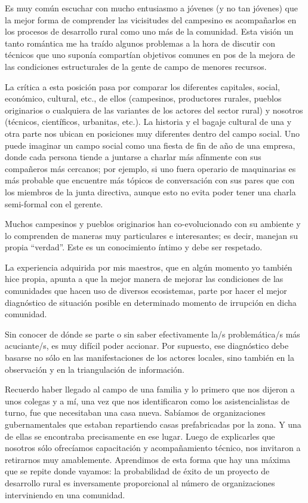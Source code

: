 \documentclass[
]{article}
\begin{document}
Es muy común escuchar con mucho entusiasmo a jóvenes (y no tan jóvenes)
que la mejor forma de comprender las vicisitudes del campesino es
acompañarlos en los procesos de desarrollo rural como uno más de la
comunidad. Esta visión un tanto romántica me ha traído algunos problemas
a la hora de discutir con técnicos que uno suponía compartían objetivos
comunes en pos de la mejora de las condiciones estructurales de la gente
de campo de menores recursos.

La crítica a esta posición pasa por comparar los diferentes capitales,
social, económico, cultural, etc., de ellos (campesinos, productores
rurales, pueblos originarios o cualquiera de las variantes de los
actores del sector rural) y nosotros (técnicos, científicos, urbanitas,
etc.). La historia y el bagaje cultural de una y otra parte nos ubican
en posiciones muy diferentes dentro del campo social. Uno puede imaginar
un campo social como una fiesta de fin de año de una empresa, donde cada
persona tiende a juntarse a charlar más afínmente con sus compañeros más
cercanos; por ejemplo, si uno fuera operario de maquinarias es más
probable que encuentre más tópicos de conversación con sus pares que con
los miembros de la junta directiva, aunque esto no evita poder tener una
charla semi-formal con el gerente.

Muchos campesinos y pueblos originarios han co-evolucionado con su
ambiente y lo comprenden de maneras muy particulares e interesantes; es
decir, manejan su propia ``verdad''. Este es un conocimiento íntimo y
debe ser respetado.

La experiencia adquirida por mis maestros, que en algún momento yo
también hice propia, apunta a que la mejor manera de mejorar las
condiciones de las comunidades que hacen uso de diversos ecosistemas,
parte por hacer el mejor diagnóstico de situación posible en determinado
momento de irrupción en dicha comunidad.

Sin conocer de dónde se parte o sin saber efectivamente la/s
problemática/s más acuciante/s, es muy difícil poder accionar. Por
supuesto, ese diagnóstico debe basarse no sólo en las manifestaciones de
los actores locales, sino también en la observación y en la
triangulación de información.

Recuerdo haber llegado al campo de una familia y lo primero que nos
dijeron a unos colegas y a mí, una vez que nos identificaron como los
asistencialistas de turno, fue que necesitaban una casa nueva. Sabíamos
de organizaciones gubernamentales que estaban repartiendo casas
prefabricadas por la zona. Y una de ellas se encontraba precisamente en
ese lugar. Luego de explicarles que nosotros sólo ofrecíamos
capacitación y acompañamiento técnico, nos invitaron a retirarnos muy
amablemente. Aprendimos de esta forma que hay una máxima que se repite
donde vayamos: la probabilidad de éxito de un proyecto de desarrollo
rural es inversamente proporcional al número de organizaciones
interviniendo en una comunidad.
\end{document}
